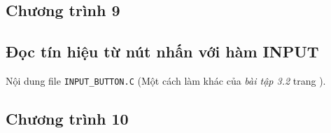\subsection*{Chương trình 9}

\subsection{Đọc tín hiệu từ nút nhấn với hàm INPUT}\label{Code:Button 3-2}
Nội dung file \verb|INPUT_BUTTON.C| (Một cách làm khác của \textit{bài tập 3.2} trang \pageref{Ex:3-2}).
\subsection*{Chương trình 10}
